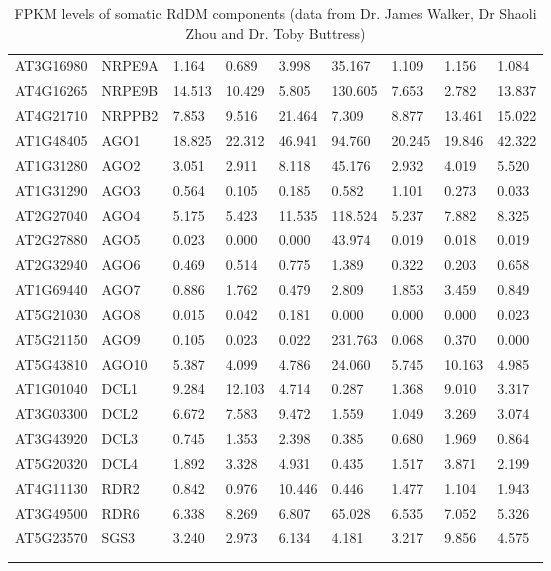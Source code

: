 \begin{landscape}
\begin{longtable}{l|l|llll|lll}
AT3G16980 & NRPE9A   & 1.164  & 0.689  & 3.998  & 35.167  & 1.109  & 1.156  & 1.084  \\
AT4G16265 & NRPE9B   & 14.513 & 10.429 & 5.805  & 130.605 & 7.653  & 2.782  & 13.837 \\
AT4G21710 & NRPPB2   & 7.853  & 9.516  & 21.464 & 7.309   & 8.877  & 13.461 & 15.022 \\ \hline
AT1G48405 & AGO1     & 18.825 & 22.312 & 46.941 & 94.760  & 20.245 & 19.846 & 42.322 \\
AT1G31280 & AGO2     & 3.051  & 2.911  & 8.118  & 45.176  & 2.932  & 4.019  & 5.520  \\
AT1G31290 & AGO3     & 0.564  & 0.105  & 0.185  & 0.582   & 1.101  & 0.273  & 0.033  \\
AT2G27040 & AGO4     & 5.175  & 5.423  & 11.535 & 118.524 & 5.237  & 7.882  & 8.325  \\
AT2G27880 & AGO5     & 0.023  & 0.000  & 0.000  & 43.974  & 0.019  & 0.018  & 0.019  \\
AT2G32940 & AGO6     & 0.469  & 0.514  & 0.775  & 1.389   & 0.322  & 0.203  & 0.658  \\
AT1G69440 & AGO7     & 0.886  & 1.762  & 0.479  & 2.809   & 1.853  & 3.459  & 0.849  \\
AT5G21030 & AGO8     & 0.015  & 0.042  & 0.181  & 0.000   & 0.000  & 0.000  & 0.023  \\
AT5G21150 & AGO9     & 0.105  & 0.023  & 0.022  & 231.763 & 0.068  & 0.370  & 0.000  \\
AT5G43810 & AGO10    & 5.387  & 4.099  & 4.786  & 24.060  & 5.745  & 10.163 & 4.985  \\ \hline
AT1G01040 & DCL1     & 9.284  & 12.103 & 4.714  & 0.287   & 1.368  & 9.010  & 3.317  \\
AT3G03300 & DCL2     & 6.672  & 7.583  & 9.472  & 1.559   & 1.049  & 3.269  & 3.074  \\
AT3G43920 & DCL3     & 0.745  & 1.353  & 2.398  & 0.385   & 0.680  & 1.969  & 0.864  \\
AT5G20320 & DCL4     & 1.892  & 3.328  & 4.931  & 0.435   & 1.517  & 3.871  & 2.199  \\ \hline
AT4G11130 & RDR2     & 0.842  & 0.976  & 10.446 & 0.446   & 1.477  & 1.104  & 1.943  \\
AT3G49500 & RDR6     & 6.338  & 8.269  & 6.807  & 65.028  & 6.535  & 7.052  & 5.326  \\ \hline
AT5G23570 & SGS3     & 3.240  & 2.973  & 6.134  & 4.181   & 3.217  & 9.856  & 4.575 \\ 
\caption{FPKM levels of somatic RdDM components (data from Dr. James Walker, Dr Shaoli Zhou and Dr. Toby Buttress)} \\
\label{tab:FPKM_soma}\\
\end{longtable}
\end{landscape}

